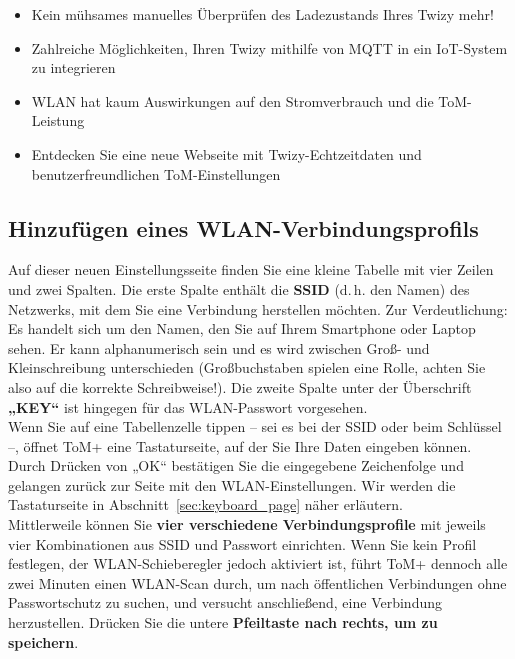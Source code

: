 \begin{itemize}
    \item Kein mühsames manuelles Überprüfen des Ladezustands Ihres Twizy mehr!
    \item Zahlreiche Möglichkeiten, Ihren Twizy mithilfe von MQTT in ein IoT-System zu integrieren
    \item WLAN hat kaum Auswirkungen auf den Stromverbrauch und die ToM-Leistung 
    \item Entdecken Sie eine neue Webseite mit Twizy-Echtzeitdaten und benutzerfreundlichen ToM-Einstellungen
\end{itemize}

\subsection{Hinzufügen eines WLAN-Verbindungsprofils}
\label{sec:add_wifi_profile}

Auf dieser neuen Einstellungsseite finden Sie eine kleine Tabelle mit vier Zeilen und zwei Spalten.
Die erste Spalte enthält die \textbf{SSID} (d. h. den Namen) des Netzwerks, mit dem Sie eine Verbindung herstellen möchten. 
Zur Verdeutlichung: Es handelt sich um den Namen, den Sie auf Ihrem Smartphone oder Laptop sehen. Er kann alphanumerisch sein und 
es wird zwischen Groß- und Kleinschreibung unterschieden (Großbuchstaben spielen eine Rolle, achten Sie also auf die korrekte Schreibweise!).
Die zweite Spalte unter der Überschrift \textbf{„KEY“} ist hingegen für das WLAN-Passwort vorgesehen.\\

Wenn Sie auf eine Tabellenzelle tippen – sei es bei der SSID oder beim Schlüssel –, öffnet ToM+ eine Tastaturseite,
auf der Sie Ihre Daten eingeben können. Durch Drücken von „OK“ bestätigen Sie die eingegebene Zeichenfolge und
gelangen zurück zur Seite mit den WLAN-Einstellungen. Wir werden die Tastaturseite in Abschnitt~\ref{sec:keyboard_page} näher erläutern.\\

Mittlerweile können Sie \textbf{vier verschiedene Verbindungsprofile} mit jeweils vier Kombinationen aus SSID
und Passwort einrichten. Wenn Sie kein Profil festlegen, der WLAN-Schieberegler jedoch aktiviert ist, führt ToM+ dennoch
alle zwei Minuten einen WLAN-Scan durch, um nach öffentlichen Verbindungen ohne Passwortschutz
zu suchen, und versucht anschließend, eine Verbindung herzustellen. Drücken Sie die untere \textbf{Pfeiltaste nach rechts, um zu speichern}.\\

